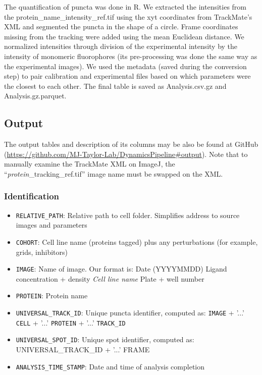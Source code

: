 The quantification of puncta was done in R. We extracted the intensities from the protein\_name\_intensity\_ref.tif using the xyt coordinates from TrackMate’s XML and segmented the puncta in the shape of a circle. Frame coordinates missing from the tracking were added using the mean Euclidean distance. We normalized intensities through division of the experimental intensity by the intensity of monomeric fluorophores (its pre-processing was done the same way as the experimental images). We used the metadata (saved during the conversion step) to pair calibration and experimental files based on which parameters were the closest to each other. The final table is saved as Analysis.csv.gz and Analysis.gz.parquet.

\subsection{Output}
The output tables and description of its columns may be also be found at GitHub (\url{https://github.com/MJ-Taylor-Lab/DynamicsPipeline\#output}). Note that to manually examine the TrackMate XML on ImageJ, the “\emph{protein}\_tracking\_ref.tif” image name must be swapped on the XML.

\subsubsection{Identification}
\begin{itemize}
\item \texttt{RELATIVE\_PATH}: Relative path to cell folder. Simplifies address to source images and parameters
\item \texttt{COHORT}: Cell line name (proteins tagged) plus any perturbations (for example, grids, inhibitors)
\item \texttt{IMAGE}: Name of image. Our format is: Date (YYYYMMDD) Ligand concentration + density \emph{Cell line name} Plate + well number
\item \texttt{PROTEIN}: Protein name
\item \texttt{UNIVERSAL\_TRACK\_ID}: Unique puncta identifier, computed as: \texttt{IMAGE} + '...' \texttt{CELL} + '...' \texttt{PROTEIN} + '...' \texttt{TRACK\_ID}
\item \texttt{UNIVERSAL\_SPOT\_ID}: Unique spot identifier, computed as: UNIVERSAL\_TRACK\_ID + '...' FRAME
\item \texttt{ANALYSIS\_TIME\_STAMP}: Date and time of analysis completion
\end{itemize}

